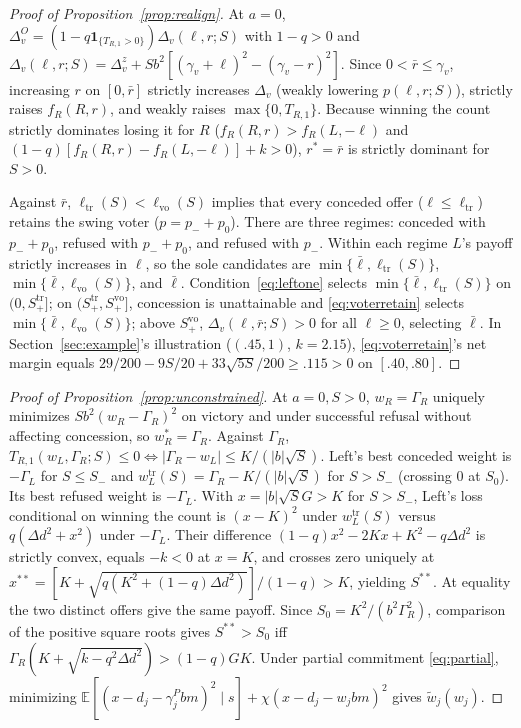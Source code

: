 \documentclass[11pt,letterpaper]{article}
\newcommand{\E}{\mathbb E}
\newcommand{\Dd}{\Delta d}
\begin{document}
\begin{proof}[Proof of Proposition~\ref{prop:realign}]
At $a=0$, $\Delta_v^O=(1-q\mathbf 1_{\{T_{R,1}>0\}})\Delta_v(\ell,r;S)$ with $1-q>0$ and $\Delta_v(\ell,r;S)=\Delta_v^z+Sb^2[(\gamma_v+\ell)^2-(\gamma_v-r)^2]$. Since $0<\bar r\le\gamma_v$, increasing $r$ on $[0,\bar r]$ strictly increases $\Delta_v$ (weakly lowering $p(\ell,r;S)$), strictly raises $f_R(R,r)$, and weakly raises $\max\{0,T_{R,1}\}$. Because winning the count strictly dominates losing it for $R$ ($f_R(R,r)>f_R(L,-\ell)$ and $(1-q)[f_R(R,r)-f_R(L,-\ell)]+k>0$), $r^*=\bar r$ is strictly dominant for $S>0$.

Against $\bar r$, $\ell_{\mathrm{tr}}(S)<\ell_{\mathrm{vo}}(S)$ implies that every conceded offer ($\ell\le\ell_{\mathrm{tr}}$) retains the swing voter ($p=p_-+p_0$). There are three regimes: conceded with $p_-+p_0$, refused with $p_-+p_0$, and refused with $p_-$. Within each regime $L$'s payoff strictly increases in $\ell$, so the sole candidates are $\min\{\bar\ell,\ell_{\mathrm{tr}}(S)\}$, $\min\{\bar\ell,\ell_{\mathrm{vo}}(S)\}$, and $\bar\ell$. Condition~\eqref{eq:leftone} selects $\min\{\bar\ell,\ell_{\mathrm{tr}}(S)\}$ on $(0,S_+^{\mathrm{tr}}]$; on $(S_+^{\mathrm{tr}},S_+^{\mathrm{vo}}]$, concession is unattainable and \eqref{eq:voterretain} selects $\min\{\bar\ell,\ell_{\mathrm{vo}}(S)\}$; above $S_+^{\mathrm{vo}}$, $\Delta_v(\ell,\bar r;S)>0$ for all $\ell\ge 0$, selecting $\bar\ell$. In Section~\ref{sec:example}'s illustration ($(.45,1)$, $k=2.15$), \eqref{eq:voterretain}'s net margin equals $29/200-9S/20+33\sqrt{5S}/200\ge .115>0$ on $[.40,.80]$.
\end{proof}

\begin{proof}[Proof of Proposition~\ref{prop:unconstrained}]
At $a=0,S>0$, $w_R=\Gamma_R$ uniquely minimizes $Sb^2(w_R-\Gamma_R)^2$ on victory and under successful refusal without affecting concession, so $w_R^*=\Gamma_R$. Against $\Gamma_R$, $T_{R,1}(w_L,\Gamma_R;S)\le 0\iff |\Gamma_R-w_L|\le K/(|b|\sqrt{S})$. Left's best conceded weight is $-\Gamma_L$ for $S\le S_-$ and $w_L^{\mathrm{tr}}(S)=\Gamma_R-K/(|b|\sqrt{S})$ for $S>S_-$ (crossing $0$ at $S_0$). Its best refused weight is $-\Gamma_L$. With $x=|b|\sqrt{S}G>K$ for $S>S_-$, Left's loss conditional on winning the count is $(x-K)^2$ under $w_L^{\mathrm{tr}}(S)$ versus $q(\Dd^2+x^2)$ under $-\Gamma_L$. Their difference $(1-q)x^2-2Kx+K^2-q\Dd^2$ is strictly convex, equals $-k<0$ at $x=K$, and crosses zero uniquely at $x^{**}=[K+\sqrt{q(K^2+(1-q)\Dd^2)}]/(1-q)>K$, yielding $S^{**}$. At equality the two distinct offers give the same payoff. Since $S_0=K^2/(b^2\Gamma_R^2)$, comparison of the positive square roots gives $S^{**}>S_0$ iff $\Gamma_R(K+\sqrt{k-q^2\Dd^2})>(1-q)GK$. Under partial commitment \eqref{eq:partial}, minimizing $\E[(x-d_j-\gamma_j^P b m)^2\mid s]+\chi(x-d_j-w_j b m)^2$ gives $\tilde w_j(w_j)$.
\end{proof}
\end{document}
